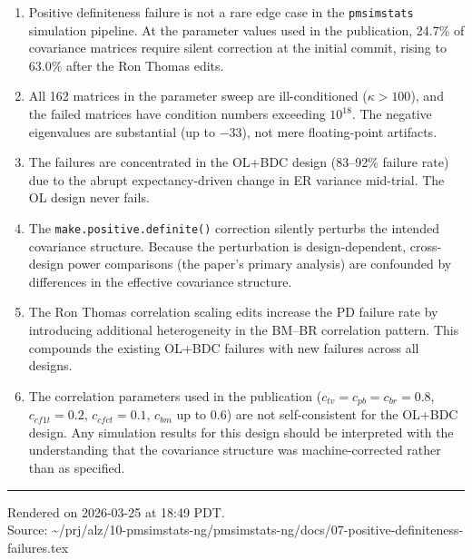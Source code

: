 \documentclass[11pt]{article}
\begin{document}
\begin{enumerate}
\item Positive definiteness failure is not a rare edge case in
  the \texttt{pmsimstats} simulation pipeline. At the parameter
  values used in the publication, 24.7\% of covariance matrices
  require silent correction at the initial commit, rising to
  63.0\% after the Ron Thomas edits.

\item All 162 matrices in the parameter sweep are
  ill-conditioned ($\kappa > 100$), and the failed matrices
  have condition numbers exceeding $10^{18}$. The negative
  eigenvalues are substantial (up to $-33$), not mere
  floating-point artifacts.

\item The failures are concentrated in the OL+BDC design
  (83--92\% failure rate) due to the abrupt expectancy-driven
  change in ER variance mid-trial. The OL design never fails.

\item The \texttt{make.positive.definite()} correction silently
  perturbs the intended covariance structure. Because the
  perturbation is design-dependent, cross-design power
  comparisons (the paper's primary analysis) are confounded
  by differences in the effective covariance structure.

\item The Ron Thomas correlation scaling edits increase the
  PD failure rate by introducing additional heterogeneity in
  the BM--BR correlation pattern. This compounds the existing
  OL+BDC failures with new failures across all designs.

\item The correlation parameters used in the publication
  ($c_{tv} = c_{pb} = c_{br} = 0.8$, $c_{cf1t} = 0.2$,
  $c_{cfct} = 0.1$, $c_{bm}$ up to 0.6) are not
  self-consistent for the OL+BDC design. Any simulation
  results for this design should be interpreted with the
  understanding that the covariance structure was
  machine-corrected rather than as specified.
\end{enumerate}

\vfill
\noindent\rule{\textwidth}{0.4pt}
{\footnotesize
Rendered on 2026-03-25 at 18:49 PDT.\\
Source: \textasciitilde/prj/alz/10-pmsimstats-ng/pmsimstats-ng/docs/07-positive-definiteness-failures.tex}
\end{document}
